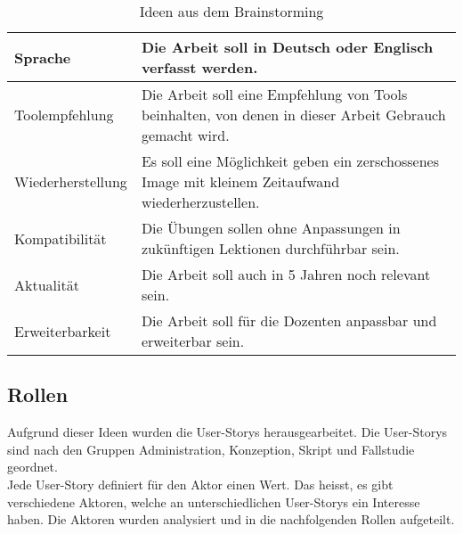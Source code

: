 \begin{table}[h!]
\begin{center}
\begin{tabular}{| p{4cm} | p{11cm} |}
      Sprache
      & Die Arbeit soll in Deutsch oder Englisch verfasst werden. \newline
      \\ \hline

      Toolempfehlung
      & Die Arbeit soll eine Empfehlung von Tools beinhalten, von denen in dieser Arbeit Gebrauch gemacht wird. \newline
      \\ \hline

      Wiederherstellung
      & Es soll eine Möglichkeit geben ein zerschossenes Image mit kleinem Zeitaufwand wiederherzustellen. \newline
      \\ \hline

      Kompatibilität              & Die Übungen sollen ohne Anpassungen in zukünftigen Lektionen durchführbar sein. \newline \\ \hline
      Aktualität                  & Die Arbeit soll auch in 5 Jahren noch relevant sein. \newline \\ \hline
      Erweiterbarkeit             & Die Arbeit soll für die Dozenten anpassbar und erweiterbar sein. \newline \\ \hline
   \end{tabular}
\end{center}
   \caption[Brainstorming]{Ideen aus dem Brainstorming}
\end{table}


\subsection{Rollen}

Aufgrund dieser Ideen wurden die User-Storys herausgearbeitet.
Die User-Storys sind nach den Gruppen Administration, Konzeption, Skript und Fallstudie geordnet. \\ 

Jede User-Story definiert für den Aktor einen Wert. Das heisst, es gibt verschiedene Aktoren, welche an unterschiedlichen
User-Storys ein Interesse haben. Die Aktoren wurden analysiert und in die nachfolgenden Rollen aufgeteilt.

